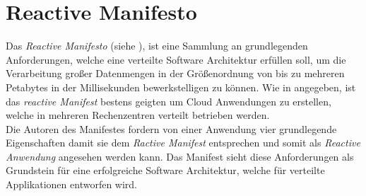 \section{Reactive Manifesto}\label{reactiveManifesto}
Das \textit{Reactive Manifesto} (siehe \cite{reactiveManifesto}), ist eine Sammlung an grundlegenden Anforderungen, welche eine verteilte Software Architektur erfüllen soll, um die Verarbeitung großer Datenmengen in der Größenordnung von bis zu mehreren Petabytes in der Millisekunden bewerkstelligen zu können. 
Wie in \cite{reactiveManifesto} angegeben, ist das \textit{reactive Manifest} bestens geigten um Cloud Anwendungen zu erstellen, welche in mehreren Rechenzentren verteilt betrieben werden. \\
Die Autoren des Manifestes fordern von einer Anwendung vier grundlegende Eigenschaften damit sie dem \textit{Ractive Manifest} entsprechen und somit als \textit{Reactive Anwendung} angesehen werden kann. Das Manifest sieht diese Anforderungen als Grundstein für eine erfolgreiche Software Architektur, welche für verteilte Applikationen entworfen wird. 
